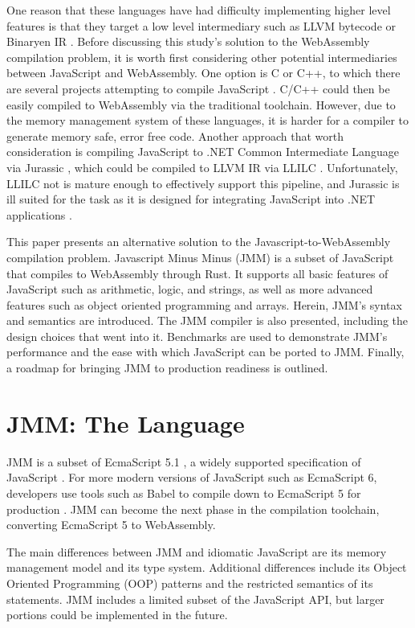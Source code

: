\documentclass[12pt]{article}
\begin{document}
	One reason that these languages have had difficulty implementing higher level features is that they target a low level intermediary such as LLVM bytecode \cite{Reiser2017} or Binaryen IR \cite{ThinScript}\cite{TurboScript}\cite{AssemblyScript}. Before discussing this study's solution to the WebAssembly compilation problem, it is worth first considering other potential intermediaries between JavaScript and WebAssembly. One option is C or C++, to which there are several projects attempting to compile JavaScript \cite{js2cpp} \cite{ts2c}. C/C++ could then be easily compiled to WebAssembly via the traditional toolchain. However, due to the memory management system of these languages, it is harder for a compiler to generate memory safe, error free code. Another approach that worth consideration is compiling JavaScript to .NET Common Intermediate Language via Jurassic \cite{Jurassic}, which could be compiled to LLVM IR via LLILC \cite{llilc}. Unfortunately, LLILC not is mature enough \cite{llilc} to effectively support this pipeline, and Jurassic is ill suited for the task as it is designed for integrating JavaScript into .NET applications \cite{Jurassic}.
	
	This paper presents an alternative solution to the Javascript-to-WebAssembly compilation problem. Javascript Minus Minus (JMM) is a subset of JavaScript that compiles to WebAssembly through Rust. It supports all basic features of JavaScript such as arithmetic, logic, and strings, as well as more advanced features such as object oriented programming and arrays. Herein, JMM's syntax and semantics are introduced. The JMM compiler is also presented, including the design choices that went into it. Benchmarks are used to demonstrate JMM's performance and the ease with which JavaScript can be ported to JMM. Finally, a roadmap for bringing JMM to production readiness is outlined.
	
	\section{JMM: The Language}
	
	JMM is a subset of EcmaScript 5.1 \cite{ecmascript2011ecmascript}, a widely supported specification of JavaScript \cite{Zaytsev}. For more modern versions of JavaScript such as EcmaScript 6, developers use tools such as Babel to compile down to EcmaScript 5 for production \cite{Babel}. JMM can become the next phase in the compilation toolchain, converting EcmaScript 5 to WebAssembly.
	
	The main differences between JMM and idiomatic JavaScript are its memory management model and its type system. Additional differences include its Object Oriented Programming (OOP) patterns and the restricted semantics of its statements. JMM includes a limited subset of the JavaScript API, but larger portions could be implemented in the future.
	
\end{document}
